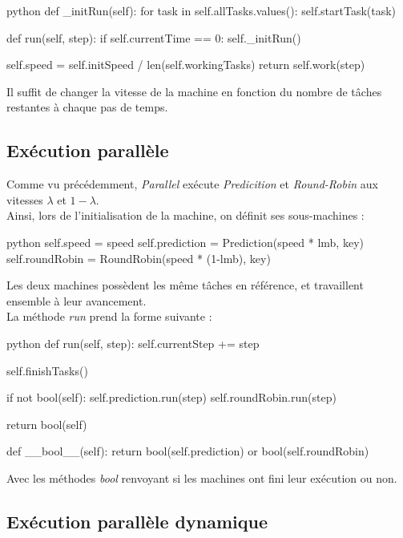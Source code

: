 \documentclass[12pt]{article}
\begin{document}
\begin{mintedbox}{python}
    def _initRun(self):
        for task in self.allTasks.values():
            self.startTask(task)
            
    def run(self, step):
        if self.currentTime == 0:
            self._initRun()

        self.speed = self.initSpeed / len(self.workingTasks)
        return self.work(step)
\end{mintedbox}

Il suffit de changer la vitesse de la machine en fonction du nombre de tâches restantes à chaque pas de temps.

\subsection{Exécution parallèle}

Comme vu précédemment, \emph{Parallel} exécute \emph{Predicition} et \emph{Round-Robin} aux vitesses $\lambda$ et $1 - \lambda$. \\

Ainsi, lors de l'initialisation de la machine, on définit ses sous-machines :
\begin{mintedbox}{python}
        self.speed = speed
        self.prediction = Prediction(speed * lmb, key)
        self.roundRobin = RoundRobin(speed * (1-lmb), key)
\end{mintedbox}

Les deux machines possèdent les même tâches en référence, et travaillent ensemble à leur avancement. \\

La méthode \emph{run} prend la forme suivante :
\begin{mintedbox}{python}
    def run(self, step):
        self.currentStep += step

        self.finishTasks()

        if not bool(self):
            self.prediction.run(step)
            self.roundRobin.run(step)

        return bool(self)
        
    def __bool__(self):
        return bool(self.prediction) or bool(self.roundRobin)
\end{mintedbox}

Avec les méthodes \emph{bool} renvoyant si les machines ont fini leur exécution ou non.

\subsection{Exécution parallèle dynamique}
\end{document}
